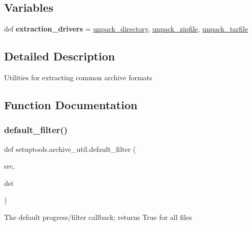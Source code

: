 \subsection*{Variables}
\begin{DoxyCompactItemize}
\item 
\mbox{\label{namespacesetuptools_1_1archive__util_a25bbce55521947398075ab8041e13ebd}} 
def {\bfseries extraction\+\_\+drivers} = \hyperlink{namespacesetuptools_1_1archive__util_a6ad75ce90d1cbed27a1d5a1dc6e4dda3}{unpack\+\_\+directory}, \hyperlink{namespacesetuptools_1_1archive__util_a01c6de8920234e1bcb47befda68d40c4}{unpack\+\_\+zipfile}, \hyperlink{namespacesetuptools_1_1archive__util_aee037d06b845eaf69e229fafccae35b9}{unpack\+\_\+tarfile}
\end{DoxyCompactItemize}


\subsection{Detailed Description}
\begin{DoxyVerb}Utilities for extracting common archive formats\end{DoxyVerb}
 

\subsection{Function Documentation}
\mbox{\label{namespacesetuptools_1_1archive__util_adede8e93e57be04915ea0d27831b654b}} 
\subsubsection{\texorpdfstring{default\+\_\+filter()}{default\_filter()}}
{\footnotesize\ttfamily def setuptools.\+archive\+\_\+util.\+default\+\_\+filter (\begin{DoxyParamCaption}\item[{}]{src,  }\item[{}]{dst }\end{DoxyParamCaption})}

\begin{DoxyVerb}The default progress/filter callback; returns True for all files\end{DoxyVerb}
 \mbox{\label{namespacesetuptools_1_1archive__util_a50b89b80cdc264528d20a0b7a7964aa4}} 
